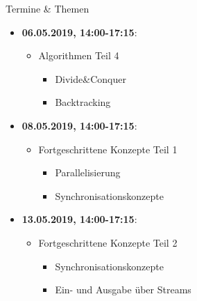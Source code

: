 \begin{frame}{Termine \& Themen}
	\begin{itemize}
		\item \textbf{06.05.2019, 14:00-17:15}:
		\begin{itemize}
			\item Algorithmen Teil 4
			\begin{itemize}
				\item Divide\&Conquer
				\item Backtracking
			\end{itemize}
		\end{itemize}
		\item \textbf{08.05.2019, 14:00-17:15}:
		\begin{itemize}
			\item Fortgeschrittene Konzepte Teil 1
			\begin{itemize}
				\item Parallelisierung
				\item Synchronisationskonzepte
			\end{itemize}
		\end{itemize}
		\item \textbf{13.05.2019, 14:00-17:15}:
		\begin{itemize}
			\item Fortgeschrittene Konzepte Teil 2
			\begin{itemize}
				\item Synchronisationskonzepte
				\item Ein- und Ausgabe über Streams
			\end{itemize}
		\end{itemize}
	\end{itemize}
\end{frame}

